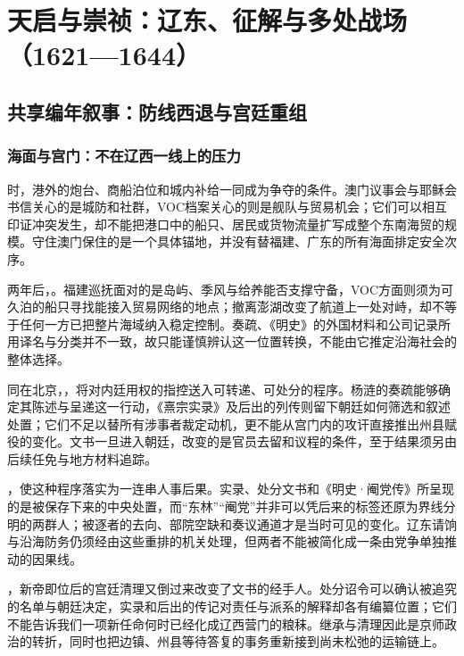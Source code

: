 \chapter{天启与崇祯：辽东、征解与多处战场（1621—1644）}
\label{ch:tianqi-chongzhen}

\section{共享编年叙事：防线西退与宫廷重组}

\subsection{海面与宫门：不在辽西一线上的压力}

时，港外的炮台、商船泊位和城内补给一同成为争夺的条件。澳门议事会与耶稣会书信关心的是城防和社群，VOC档案关心的则是舰队与贸易机会；它们可以相互印证冲突发生，却不能把港口中的船只、居民或货物流量扩写成整个东南海贸的规模。守住澳门保住的是一个具体锚地，并没有替福建、广东的所有海面排定安全次序。

两年后，。福建巡抚面对的是岛屿、季风与给养能否支撑守备，VOC方面则须为可久泊的船只寻找能接入贸易网络的地点；撤离澎湖改变了航道上一处对峙，却不等于任何一方已把整片海域纳入稳定控制。奏疏、《明史》的外国材料和公司记录所用译名与分类并不一致，故只能谨慎辨认这一位置转换，不能由它推定沿海社会的整体选择。

同在北京，，将对内廷用权的指控送入可转递、可处分的程序。杨涟的奏疏能够确定其陈述与呈递这一行动，《熹宗实录》及后出的列传则留下朝廷如何筛选和叙述处置；它们不足以替所有涉事者裁定动机，更不能从宫门内的攻讦直接推出州县赋役的变化。文书一旦进入朝廷，改变的是官员去留和议程的条件，至于结果须另由后续任免与地方材料追踪。

，使这种程序落实为一连串人事后果。实录、处分文书和《明史·阉党传》所呈现的是被保存下来的中央处置，而“东林”“阉党”并非可以凭后来的标签还原为界线分明的两群人；被逐者的去向、部院空缺和奏议通道才是当时可见的变化。辽东请饷与沿海防务仍须经由这些重排的机关处理，但两者不能被简化成一条由党争单独推动的因果线。

，新帝即位后的宫廷清理又倒过来改变了文书的经手人。处分诏令可以确认被追究的名单与朝廷决定，实录和后出的传记对责任与派系的解释却各有编纂位置；它们不能告诉我们一项新任命何时已经化成辽西营门的粮秣。继承与清理因此是京师政治的转折，同时也把边镇、州县等待答复的事务重新接到尚未松弛的运输链上。

